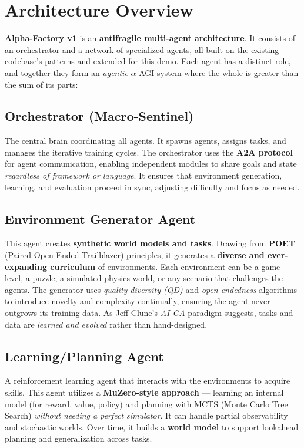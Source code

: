 \documentclass{article}
\begin{document}
\section{Architecture Overview}
\textbf{Alpha-Factory v1} is an \textbf{antifragile multi-agent architecture}. It consists of an orchestrator and a network of specialized agents, all built on the existing codebase’s patterns and extended for this demo. Each agent has a distinct role, and together they form an \emph{agentic} \(\alpha\)-AGI system where the whole is greater than the sum of its parts:

\subsection{Orchestrator (Macro-Sentinel)}
The central brain coordinating all agents. It spawns agents, assigns tasks, and manages the iterative training cycles. The orchestrator uses the \textbf{A2A protocol} for agent communication, enabling independent modules to share goals and state \emph{regardless of framework or language}. It ensures that environment generation, learning, and evaluation proceed in sync, adjusting difficulty and focus as needed.

\subsection{Environment Generator Agent}
This agent creates \textbf{synthetic world models and tasks}. Drawing from \textbf{POET} (Paired Open-Ended Trailblazer) principles, it generates a \textbf{diverse and ever-expanding curriculum} of environments. Each environment can be a game level, a puzzle, a simulated physics world, or any scenario that challenges the agents. The generator uses \emph{quality-diversity (QD)} and \emph{open-endedness} algorithms to introduce novelty and complexity continually, ensuring the agent never outgrows its training data. As Jeff Clune’s \emph{AI-GA} paradigm suggests, tasks and data are \emph{learned and evolved} rather than hand-designed.

\subsection{Learning/Planning Agent}
A reinforcement learning agent that interacts with the environments to acquire skills. This agent utilizes a \textbf{MuZero-style approach} — learning an internal model (for reward, value, policy) and planning with MCTS (Monte Carlo Tree Search) \emph{without needing a perfect simulator}. It can handle partial observability and stochastic worlds. Over time, it builds a \textbf{world model} to support lookahead planning and generalization across tasks.
\end{document}
